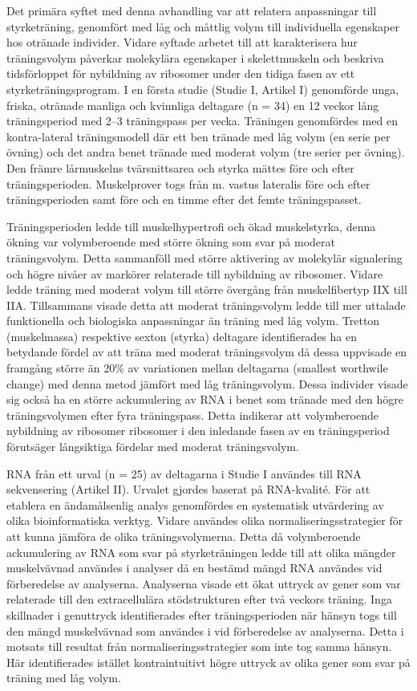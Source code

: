 \documentclass[twoside,10pt]{gihclass} %
\begin{document}
Det primära syftet med denna avhandling var att relatera anpassningar till styrketräning, genomfört med låg och måttlig volym till individuella egenskaper hos otränade individer. Vidare syftade arbetet till att karakterisera hur träningsvolym påverkar molekylära egenskaper i skelettmuskeln och beskriva tidsförloppet för nybildning av ribosomer under den tidiga fasen av ett styrketräningsprogram.
I en första studie (Studie I, Artikel I) genomförde unga, friska, otränade manliga och kvinnliga deltagare (n = 34) en 12 veckor lång träningsperiod med 2--3 träningspass per vecka. Träningen genomfördes med en kontra-lateral träningsmodell där ett ben tränade med låg volym (en serie per övning) och det andra benet tränade med moderat volym (tre serier per övning). Den främre lårmuskelns tvärsnittsarea och styrka mättes före och efter träningsperioden. Muskelprover togs från m. vastus lateralis före och efter träningsperioden samt före och en timme efter det femte träningspasset.

Träningsperioden ledde till muskelhypertrofi och ökad muskelstyrka, denna ökning var volymberoende med större ökning som svar på moderat träningsvolym. Detta sammanföll med större aktivering av molekylär signalering och högre nivåer av markörer relaterade till nybildning av ribosomer. Vidare ledde träning med moderat volym till större övergång från muskelfibertyp IIX till IIA. Tillsammans visade detta att moderat träningsvolym ledde till mer uttalade funktionella och biologiska anpassningar än träning med låg volym. Tretton (muskelmassa) respektive sexton (styrka) deltagare identifierades ha en betydande fördel av att träna med moderat träningsvolym då dessa uppvisade en framgång större än 20\% av variationen mellan deltagarna (smallest worthwile change) med denna metod jämfört med låg träningsvolym. Dessa individer visade sig också ha en större ackumulering av RNA i benet som tränade med den högre träningsvolymen efter fyra träningspass. Detta indikerar att volymberoende nybildning av ribosomer ribosomer i den inledande fasen av en träningsperiod förutsäger långsiktiga fördelar med moderat träningsvolym.

RNA från ett urval (n = 25) av deltagarna i Studie I användes till RNA sekvensering (Artikel II). Urvalet gjordes baserat på RNA-kvalité. För att etablera en ändamålsenlig analys genomfördes en systematisk utvärdering av olika bioinformatiska verktyg. Vidare användes olika normaliseringsstrategier för att kunna jämföra de olika träningsvolymerna. Detta då volymberoende ackumulering av RNA som svar på styrketräningen ledde till att olika mängder muskelvävnad användes i analyser då en bestämd mängd RNA användes vid förberedelse av analyserna. Analyserna visade ett ökat uttryck av gener som var relaterade till den extracellulära stödstrukturen efter två veckors träning. Inga skillnader i genuttryck identifierades efter träningsperioden när hänsyn togs till den mängd muskelvävnad som användes i vid förberedelse av analyserna. Detta i motsats till resultat från normaliseringsstrategier som inte tog samma hänsyn. Här identifierades istället kontraintuitivt högre uttryck av olika gener som svar på träning med låg volym.
\end{document}
